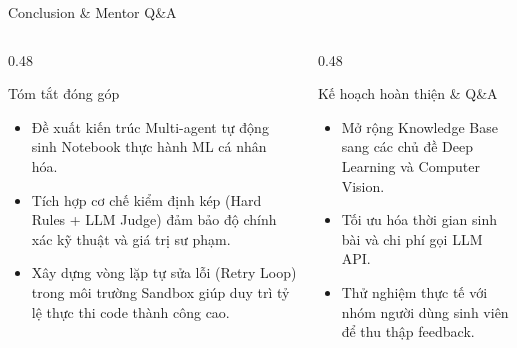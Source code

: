 \documentclass[aspectratio=169, 10pt, t]{beamer}
\begin{document}
\begin{frame}[fragile]{Conclusion \& Mentor Q\&A}
  \begin{columns}[T]
    \begin{column}{0.48\textwidth}
      \begin{block}{Tóm tắt đóng góp}
        \begin{itemize}
          \item Đề xuất kiến trúc Multi-agent tự động sinh Notebook thực hành ML cá nhân hóa.
          \item Tích hợp cơ chế kiểm định kép (Hard Rules + LLM Judge) đảm bảo độ chính xác kỹ thuật và giá trị sư phạm.
          \item Xây dựng vòng lặp tự sửa lỗi (Retry Loop) trong môi trường Sandbox giúp duy trì tỷ lệ thực thi code thành công cao.
        \end{itemize}
      \end{block}
    \end{column}
    
    \begin{column}{0.48\textwidth}
      \begin{block}{Kế hoạch hoàn thiện \& Q\&A}
        \begin{itemize}
          \item Mở rộng Knowledge Base sang các chủ đề Deep Learning và Computer Vision.
          \item Tối ưu hóa thời gian sinh bài và chi phí gọi LLM API.
          \item Thử nghiệm thực tế với nhóm người dùng sinh viên để thu thập feedback.
        \end{itemize}
      \end{block}
    \end{column}
  \end{columns}
\end{frame}


\end{document}
